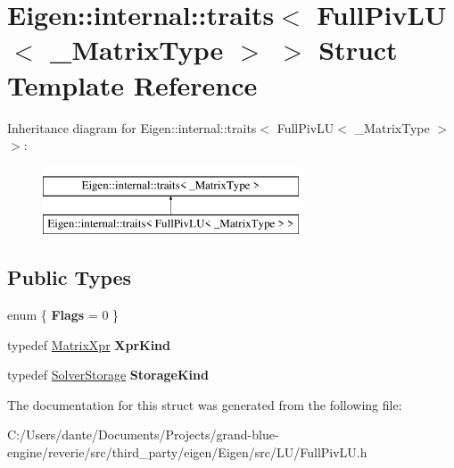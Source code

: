 \hypertarget{struct_eigen_1_1internal_1_1traits_3_01_full_piv_l_u_3_01___matrix_type_01_4_01_4}{}\section{Eigen\+::internal\+::traits$<$ Full\+Piv\+LU$<$ \+\_\+\+Matrix\+Type $>$ $>$ Struct Template Reference}
\label{struct_eigen_1_1internal_1_1traits_3_01_full_piv_l_u_3_01___matrix_type_01_4_01_4}
Inheritance diagram for Eigen\+::internal\+::traits$<$ Full\+Piv\+LU$<$ \+\_\+\+Matrix\+Type $>$ $>$\+:\begin{figure}[H]
\begin{center}
\leavevmode
\includegraphics[height=2.000000cm]{struct_eigen_1_1internal_1_1traits_3_01_full_piv_l_u_3_01___matrix_type_01_4_01_4}
\end{center}
\end{figure}
\subsection*{Public Types}
\begin{DoxyCompactItemize}
\item 
\mbox{\label{struct_eigen_1_1internal_1_1traits_3_01_full_piv_l_u_3_01___matrix_type_01_4_01_4_a90ac099e1c69390895f26409c38bd05c}} 
enum \{ {\bfseries Flags} = 0
 \}
\item 
\mbox{\label{struct_eigen_1_1internal_1_1traits_3_01_full_piv_l_u_3_01___matrix_type_01_4_01_4_a0a2f243f0f1cde42de22fd71afeb8298}} 
typedef \mbox{\hyperlink{struct_eigen_1_1_matrix_xpr}{Matrix\+Xpr}} {\bfseries Xpr\+Kind}
\item 
\mbox{\label{struct_eigen_1_1internal_1_1traits_3_01_full_piv_l_u_3_01___matrix_type_01_4_01_4_a6676451bd5a119348b521f68ee2ef944}} 
typedef \mbox{\hyperlink{struct_eigen_1_1_solver_storage}{Solver\+Storage}} {\bfseries Storage\+Kind}
\end{DoxyCompactItemize}


The documentation for this struct was generated from the following file\+:\begin{DoxyCompactItemize}
\item 
C\+:/\+Users/dante/\+Documents/\+Projects/grand-\/blue-\/engine/reverie/src/third\+\_\+party/eigen/\+Eigen/src/\+L\+U/Full\+Piv\+L\+U.\+h\end{DoxyCompactItemize}

